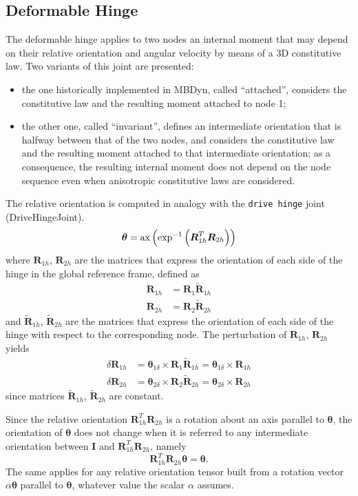 \documentclass[10pt,dvips,fleqn]{report}
\newcommand{\T}[1]{\boldsymbol{#1}}
\begin{document}
\subsection{Deformable Hinge}
The deformable hinge applies to two nodes an internal moment that may depend
on their relative orientation and angular velocity by means 
of a 3D constitutive law.
Two variants of this joint are presented:
\begin{itemize}
\item the one historically implemented in MBDyn, called ``attached'',
considers the constitutive law and the resulting moment attached to node 1;
\item the other one, called ``invariant'', defines an intermediate
orientation that is halfway between that of the two nodes, and considers
the constitutive law and the resulting moment attached to that intermediate
orientation; as a consequence, the resulting internal moment does not depend
on the node sequence even when anisotropic constitutive laws are considered.
\end{itemize}
The relative orientation is computed in analogy with the \texttt{drive hinge}
joint (DriveHingeJoint).
\begin{equation}
	\T{\theta} =
	\llk{ax}\plbr{\llk{exp}^{-1}\plbr{\T{R}_{1h}^T \T{R}_{2h}}}
\end{equation}
where $\T{R}_{1h}$, $\T{R}_{2h}$ are the matrices that express
the orientation of each side of the hinge in the global reference frame,
defined as
\begin{align}
	\T{R}_{1h} &= \T{R}_{1} \tilde{\T{R}}_{1h} \\
	\T{R}_{2h} &= \T{R}_{2} \tilde{\T{R}}_{2h}
\end{align}
and $\tilde{\T{R}}_{1h}$, $\tilde{\T{R}}_{2h}$ are the matrices
that express the orientation of each side of the hinge with respect
to the corresponding node.
The perturbation of $\T{R}_{1h}$, $\T{R}_{2h}$ yields
\begin{align}
	\delta \T{R}_{1h} &= \T{\theta}_{1\delta} \times \T{R}_{1} \tilde{\T{R}}_{1h}
		= \T{\theta}_{1\delta} \times \T{R}_{1h} \\
	\delta \T{R}_{2h} &= \T{\theta}_{2\delta} \times \T{R}_{2} \tilde{\T{R}}_{2h}
		= \T{\theta}_{2\delta} \times \T{R}_{2h}
\end{align}
since matrices $\tilde{\T{R}}_{1h}$, $\tilde{\T{R}}_{2h}$ are constant.

Since the relative orientation $\T{R}_{1h}^T \T{R}_{2h}$ is a rotation 
about an axis parallel to $\T{\theta}$, the orientation of $\T{\theta}$
does not change when it is referred to any intermediate orientation
between $\T{I}$ and $\T{R}_{1h}^T \T{R}_{2h}$, namely
\begin{equation}
	\T{R}_{1h}^T \T{R}_{2h}\T{\theta} = \T{\theta} .
\end{equation}
The same applies for any relative orientation tensor built from a rotation
vector $\alpha\T{\theta}$ parallel to $\T{\theta}$, whatever value 
the scalar $\alpha$ assumes.
\end{document}
